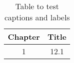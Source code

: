 \begin{table}[h!]
\centering
\begin{tabular}{cc}
{Chapter} & {Title} \\ 
\hline
{1} & {12.1} \\
\end{tabular}
\caption{Table to test captions and labels}
\label{table:1}
\end{table}